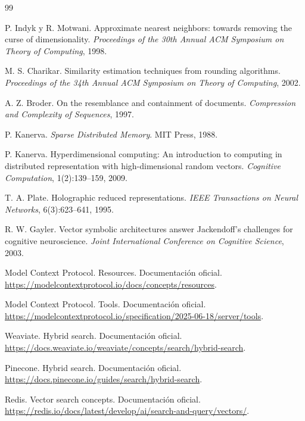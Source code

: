 \documentclass[11pt]{article}
\begin{document}
\begin{thebibliography}{99}

P. Indyk y R. Motwani.
\newblock Approximate nearest neighbors: towards removing the curse of dimensionality.
\newblock \emph{Proceedings of the 30th Annual ACM Symposium on Theory of Computing}, 1998.

M. S. Charikar.
\newblock Similarity estimation techniques from rounding algorithms.
\newblock \emph{Proceedings of the 34th Annual ACM Symposium on Theory of Computing}, 2002.

A. Z. Broder.
\newblock On the resemblance and containment of documents.
\newblock \emph{Compression and Complexity of Sequences}, 1997.

P. Kanerva.
\newblock \emph{Sparse Distributed Memory}.
\newblock MIT Press, 1988.

P. Kanerva.
\newblock Hyperdimensional computing: An introduction to computing in distributed representation with high-dimensional random vectors.
\newblock \emph{Cognitive Computation}, 1(2):139--159, 2009.

T. A. Plate.
\newblock Holographic reduced representations.
\newblock \emph{IEEE Transactions on Neural Networks}, 6(3):623--641, 1995.

R. W. Gayler.
\newblock Vector symbolic architectures answer Jackendoff's challenges for cognitive neuroscience.
\newblock \emph{Joint International Conference on Cognitive Science}, 2003.

Model Context Protocol.
\newblock Resources.
\newblock Documentación oficial. \url{https://modelcontextprotocol.io/docs/concepts/resources}.

Model Context Protocol.
\newblock Tools.
\newblock Documentación oficial. \url{https://modelcontextprotocol.io/specification/2025-06-18/server/tools}.

Weaviate.
\newblock Hybrid search.
\newblock Documentación oficial. \url{https://docs.weaviate.io/weaviate/concepts/search/hybrid-search}.

Pinecone.
\newblock Hybrid search.
\newblock Documentación oficial. \url{https://docs.pinecone.io/guides/search/hybrid-search}.

Redis.
\newblock Vector search concepts.
\newblock Documentación oficial. \url{https://redis.io/docs/latest/develop/ai/search-and-query/vectors/}.

\end{thebibliography}
\end{document}
